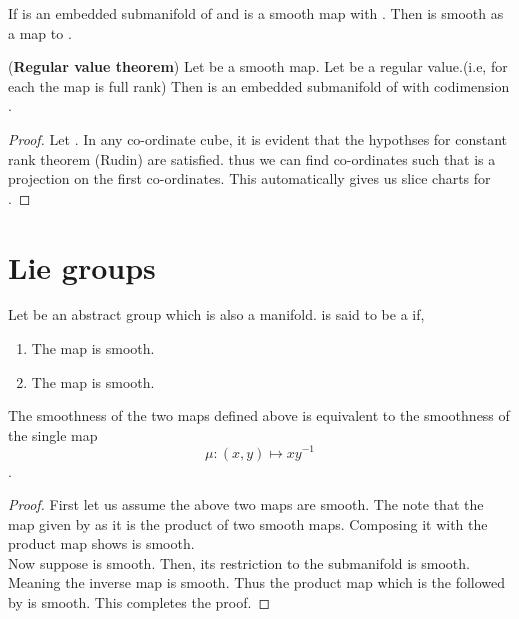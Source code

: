 \documentclass{article}
\begin{document}
\begin{corollary*}
    If  is an embedded submanifold of  and  is a smooth map with . Then \mm{\phi} is smooth as a map to .
\end{corollary*}

\begin{theorem}
    (\textbf{Regular value theorem}) Let  be a smooth map. Let  be a regular value.(i.e, for each  the map  is full rank)
    Then  is an embedded submanifold of  with codimension .
\end{theorem}
\begin{proof}
    Let . In any co-ordinate cube, it is evident that the hypothses for constant rank theorem (Rudin) are satisfied.
    thus we can find co-ordinates such that \mm{\phi} is a projection on the first  co-ordinates. This automatically gives us slice charts for .
\end{proof}

\section{Lie groups}

\begin{definition}
    Let  be an abstract group which is also a manifold.  is said to be a  if,
    \begin{enumerate}
        \item The map  is smooth.
        \item The map  is smooth.
    \end{enumerate}
\end{definition}

\begin{exercise*}
    The smoothness of the two maps defined above is equivalent to the smoothness of the single map $$\mu:(x,y)\mapsto xy^{-1}$$.
\end{exercise*}
\begin{proof}
    First let us assume the above two maps are smooth. The note that the map  given by  as it is the product of two smooth maps.
    Composing it with the product map shows \mm{\mu} is smooth.\\
    Now suppose \mm{\mu} is smooth. Then, its restriction to the submanifold  is smooth. Meaning the inverse map is smooth. Thus the product map which is 
    the \mm{\tau} followed by \mm{\mu} is smooth. This completes the proof.
\end{proof}
\end{document}
